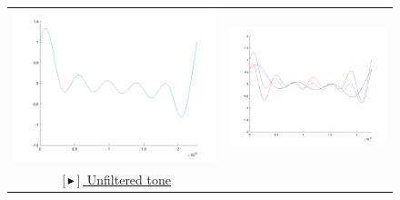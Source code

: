\begin{figure}[h]
    \centering
    \begin{tabular}{cc}
        \includegraphics[scale=.15]{6th_order_tone.png} & \includegraphics[scale=.15]{6th_order_tone_LPF_HPF.png}\\
        \href{https://drive.google.com/file/d/18jKNvtlR9ocDlZKemNlN8vrQi96WZRs7/view?usp=sharing}{\color{blue} $[\blacktriangleright]$ Unfiltered tone}\\

\end{tabular}
\end{figure}
